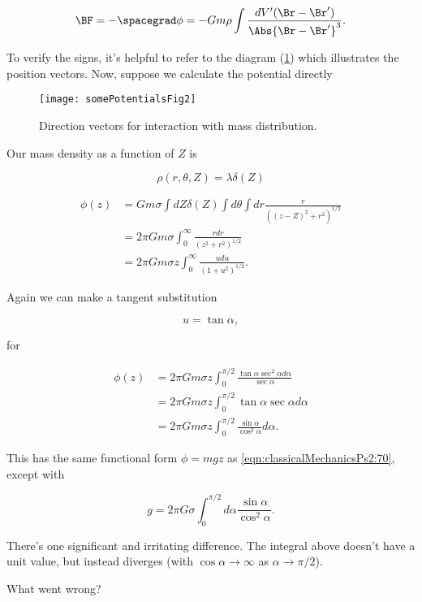 \begin{equation}\label{eqn:classicalMechanicsPs2:130}
\BF = - \spacegrad \phi = - G m \rho \int \frac{dV' (\Br - \Br')}{\Abs{\Br - \Br'}^3}.
\end{equation}

To verify the signs, it's helpful to refer to the diagram (\ref{fig:classicalMechanicsPs2:somePotentialsFig2}) which illustrates the position vectors.  Now, suppose we calculate the potential directly
\begin{figure}[htp]
   \centering
   \texttt{[image: somePotentialsFig2]}
   \caption{Direction vectors for interaction with mass distribution.}\label{fig:classicalMechanicsPs2:somePotentialsFig2}
\end{figure}

Our mass density as a function of $Z$ is

\begin{equation}\label{eqn:classicalMechanicsPs2:n}
\rho(r, \theta, Z) = \lambda \delta(Z)
\end{equation}

\begin{align*}
\phi(z)
&= G m \sigma \int dZ \delta(Z) \int d\theta \int dr \frac{r }{((z-Z)^2 + r^2)^{1/2}} \\
&= 2 \pi G m \sigma \int_0^\infty \frac{r dr }{(z^2 + r^2)^{1/2}} \\
&= 2 \pi G m \sigma z \int_0^\infty \frac{u du }{(1 + u^2)^{1/2}}.
\end{align*}

Again we can make a tangent substitution

\begin{equation}\label{eqn:classicalMechanicsPs2:150}
u = \tan\alpha,
\end{equation}

for

\begin{align*}
\phi(z)
&= 2 \pi G m \sigma z \int_0^{\pi/2} \frac{\tan \alpha \sec^2 \alpha d \alpha }{\sec\alpha} \\
&= 2 \pi G m \sigma z \int_0^{\pi/2} \tan \alpha \sec \alpha d \alpha \\
&= 2 \pi G m \sigma z \int_0^{\pi/2} \frac{\sin \alpha}{\cos^2 \alpha} d \alpha.
\end{align*}

This has the same functional form $\phi = m g z$ as \ref{eqn:classicalMechanicsPs2:70}, except with

\begin{equation}\label{eqn:classicalMechanicsPs2:n}
g = 2 \pi G \sigma \int_0^{\pi/2} d\alpha \frac{\sin \alpha}{\cos^2 \alpha}.
\end{equation}

There's one significant and irritating difference.  The integral above doesn't have a unit value, but instead diverges (with $\cos\alpha \rightarrow \infty$ as $\alpha \rightarrow \pi/2$).

What went wrong?

\EndNoBibArticle
